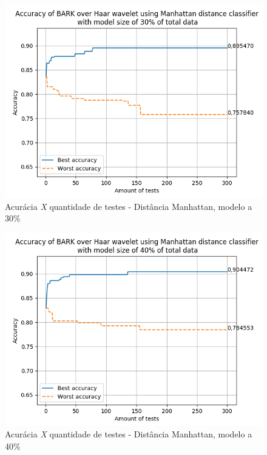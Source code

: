 \begin{myenv}{1.5}
		\newpage
		\begin{figure}[h]
			\centering
			\includegraphics{images/results/confusionMatrices/classifier_Manhattan_30.png}
			\caption{Acurácia \textit{X} quantidade de testes - Distância Manhattan, modelo a 30\%}
			\label{fig:classifiermanhattan30}
		\end{figure}
		
		
		\newpage
		\begin{figure}[h]
			\centering
			\includegraphics{images/results/confusionMatrices/classifier_Manhattan_40.png}
			\caption{Acurácia \textit{X} quantidade de testes - Distância Manhattan, modelo a 40\%}
			\label{fig:classifiermanhattan40}
		\end{figure}
		
		

\end{myenv}

